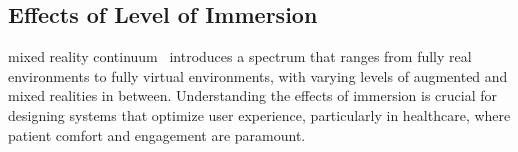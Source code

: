 

\subsection{Effects of Level of Immersion}

 mixed reality continuum~\cite{milgram1995augmented} introduces a spectrum that ranges from fully real environments to fully virtual environments, with varying levels of augmented and mixed realities in between. Understanding the effects of immersion is crucial for designing systems that optimize user experience, particularly in healthcare, where patient comfort and engagement are paramount.

